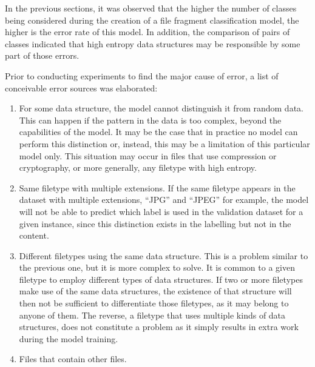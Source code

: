 \label{sec:exprandom}

In the previous sections, it was observed that the higher the number of classes being considered during the creation of a file fragment classification model, the higher is the error rate of this model. In addition, the comparison of pairs of classes indicated that high entropy data structures may be responsible by some part of those errors.

Prior to conducting experiments to find the major cause of error, a list of conceivable error sources was elaborated:
\begin{enumerate}
    \item For some data structure, the model cannot distinguish it from random data. This can happen if the pattern in the data is too complex, beyond the capabilities of the model. It may be the case that in practice no model can perform this distinction or, instead, this may be a limitation of this particular model only. This situation may occur in files that use compression or cryptography, or more generally, any filetype with high entropy.
    \item Same filetype with multiple extensions. If the same filetype appears in the dataset with multiple extensions, ``JPG'' and ``JPEG'' for example, the model will not be able to predict which label is used in the validation dataset for a given instance, since this distinction exists in the labelling but not in the content.
    \item Different filetypes using the same data structure. This is a problem similar to the previous one, but it is more complex to solve. It is common to a given filetype to employ different types of data structures. If two or more filetypes make use of the same data structures, the existence of that structure will then not be sufficient to differentiate those filetypes, as it may belong to anyone of them.
    The reverse, a filetype that uses multiple kinds of data structures, does not constitute a problem as it simply results in extra work during the model training.
    \item Files that contain other files.
\end{enumerate}





